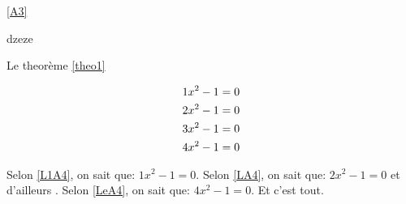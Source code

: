 \eqref{A3}




\begin{theo}
 \label{theo1}
 dzeze
\end{theo}



Le theorème \ref{theo1}



\begin{align}
 1x^{2}-1=0  \label{L1A4}\\
  2x^{2}-1=0\label{LA4}\\
   3x^{2}-1=0\notag\\
    4x^{2}-1=0\label{LeA4}
\end{align}

Selon \eqref{L1A4}, on sait que: $ 1x^{2}-1=0 $. Selon \eqref{LA4}, on sait que: $   2x^{2}-1=0 $ et d'ailleurs . Selon \eqref{LeA4}, on sait que: $     4x^{2}-1=0 $. Et c'est tout.




